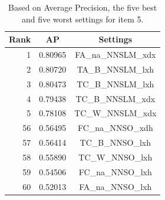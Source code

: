 \documentclass[11pt,letterpaper]{article}
\begin{document}
\begin{table}[htb!]
\begin{center}
\begin{tabular}{|r|c|c|}
 \hline
 Rank & AP & Settings \\
 \hline
 \hline
 1 & 0.80965 & FA\_na\_NNSLM\_xdx \\
 \hline
 2 & 0.80720 & TA\_B\_NNSLM\_lxh \\
 \hline
 3 & 0.80473 & TC\_B\_NNSLM\_lxh \\
 \hline
 4 & 0.79438 & TC\_B\_NNSLM\_xdx \\
 \hline
 5 & 0.78108 & TC\_W\_NNSLM\_xdx \\
 \hline
 \hline 
 56 & 0.56495 & FC\_na\_NNSO\_xdh \\
 \hline
 57 & 0.56414 & TC\_B\_NNSO\_lxh \\
 \hline
 58 & 0.55890 & TC\_W\_NNSO\_lxh \\
 \hline
 59 & 0.54506 & FC\_na\_NNSO\_lxh \\
 \hline
 60 & 0.52013 & FA\_na\_NNSO\_lxh \\
 \hline
\end{tabular}
\caption{Based on Average Precision, the five best and five worst settings for item 5.}
\label{tab:i05-dist-ranked-settings}
\end{center}
\end{table}
\end{document}
